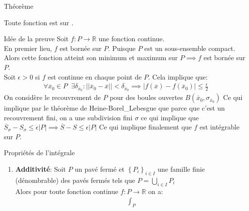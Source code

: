 \begin{parag}{Théorème}
    \begin{theoreme}
        Toute fonction  est  sur .
    \end{theoreme}
    \begin{subparag}{Idée de la preuve}
        Soit $f : P \to \mathbb{R}$ une fonction continue.\\
        En premier lieu, $f$ est bornée sur $P$. Puisque $P$ est un sous-ensemble compact. Alors cette fonction atteint son minimum et maximum sur $P \implies f$ est bornée sur $P$.\\
        Soit $\epsilon > 0$ si $f$ est continue en chaque point de $P$. Cela implique que:
        \begin{align*} \forall \overline{x}_0 \in P\;\; \exists \delta_{\overline{x}_0}  : \left|\left|\overline{x}_0 - \overline{x}\right|\right|< \delta_{\overline{x}_0} \implies \left|f\left(\overline{x}\right) - f\left(\overline{x}_0\right)\right| \leq \frac{\epsilon}{2}\end{align*}
        On considère le recouvrement de $P$ pour des boules ouvertes $B\left(\overline{x}_0, \sigma_{\overline{x}_0}\right)$ Ce qui implique par le théorème de Heine-Borel_Lebesgue que parce que c'est un recouvrement fini, on a une subdivision fini $\sigma$ ce qui implique que $\overline{S}_{\sigma} - S_{\sigma} \leq \epsilon\left|P\right| \implies \overline{S} - S \leq \epsilon \left| P\right|$ Ce qui implique finalement que $f$ est intégrable sur $P$.
    \end{subparag}
\end{parag}
\begin{parag}{Propriétés de l'intégrale}
    \begin{enumerate}
        \item \textbf{Additivité}: Soit $P$ un pavé fermé et $\left\{P_i\right\}_{i \in I}$ une famille finie (dénombrable) des pavés fermés tels que $P =  \bigcup_{i \in I}P_i$ \\
            Alors pour toute fonction continue $f: P \to \mathbb{R}$ on a:
            \begin{align*} \int_P \end{align*}

    \end{enumerate}
    
\end{parag}
